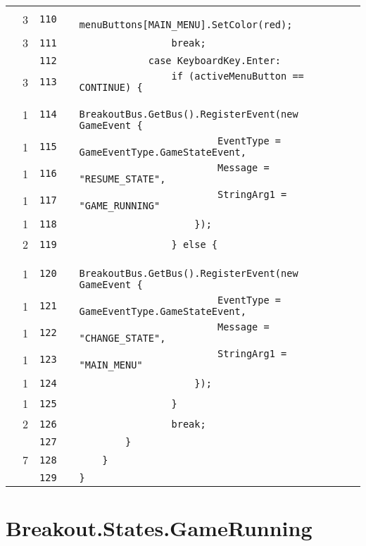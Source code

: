 \documentclass[a4paper,landscape,10pt]{article}
\begin{document}
\begin{longtable}[l]{lrrll}
\cellcolor{green} & 3 & \verb~110~ & & \verb~                menuButtons[MAIN_MENU].SetColor(red);~\\
\cellcolor{green} & 3 & \verb~111~ & & \verb~                break;~\\
\cellcolor{gray} &  & \verb~112~ & & \verb~            case KeyboardKey.Enter:~\\
\cellcolor{green} & 3 & \verb~113~ & & \verb~                if (activeMenuButton == CONTINUE) {~\\
\cellcolor{green} & 1 & \verb~114~ & & \verb~                    BreakoutBus.GetBus().RegisterEvent(new GameEvent {~\\
\cellcolor{green} & 1 & \verb~115~ & & \verb~                        EventType = GameEventType.GameStateEvent,~\\
\cellcolor{green} & 1 & \verb~116~ & & \verb~                        Message = "RESUME_STATE",~\\
\cellcolor{green} & 1 & \verb~117~ & & \verb~                        StringArg1 = "GAME_RUNNING"~\\
\cellcolor{green} & 1 & \verb~118~ & & \verb~                    });~\\
\cellcolor{green} & 2 & \verb~119~ & & \verb~                } else {~\\
\cellcolor{green} & 1 & \verb~120~ & & \verb~                    BreakoutBus.GetBus().RegisterEvent(new GameEvent {~\\
\cellcolor{green} & 1 & \verb~121~ & & \verb~                        EventType = GameEventType.GameStateEvent,~\\
\cellcolor{green} & 1 & \verb~122~ & & \verb~                        Message = "CHANGE_STATE",~\\
\cellcolor{green} & 1 & \verb~123~ & & \verb~                        StringArg1 = "MAIN_MENU"~\\
\cellcolor{green} & 1 & \verb~124~ & & \verb~                    });~\\
\cellcolor{green} & 1 & \verb~125~ & & \verb~                }~\\
\cellcolor{green} & 2 & \verb~126~ & & \verb~                break;~\\
\cellcolor{gray} &  & \verb~127~ & & \verb~        }~\\
\cellcolor{green} & 7 & \verb~128~ & & \verb~    }~\\
\cellcolor{gray} &  & \verb~129~ & & \verb~}~\\
\end{longtable}
\newpage
\section{Breakout.States.GameRunning}
\end{document}
